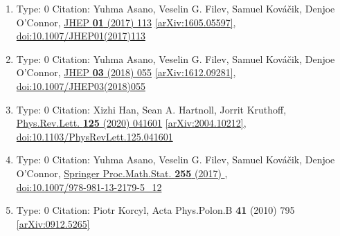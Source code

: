 \documentclass[a4paper,10pt]{article}
\begin{document}
\begin{enumerate}
\begin{enumerate}
  \item Type: 0 Citation: Yuhma Asano, Veselin G. Filev, Samuel Kováčik, Denjoe O'Connor, \href{https://www.doi.org/10.1007/JHEP01(2017)113}{JHEP {\bf 01} (2017) 113}  \href{https://arxiv.org/abs/1605.05597}{[arXiv:1605.05597]},\\\href{https://www.doi.org/10.1007/JHEP01(2017)113}{doi:10.1007/JHEP01(2017)113}
  \item Type: 0 Citation: Yuhma Asano, Veselin G. Filev, Samuel Kováčik, Denjoe O'Connor, \href{https://www.doi.org/10.1007/JHEP03(2018)055}{JHEP {\bf 03} (2018) 055}  \href{https://arxiv.org/abs/1612.09281}{[arXiv:1612.09281]},\\\href{https://www.doi.org/10.1007/JHEP03(2018)055}{doi:10.1007/JHEP03(2018)055}
  \item Type: 0 Citation: Xizhi Han, Sean A. Hartnoll, Jorrit Kruthoff, \href{https://www.doi.org/10.1103/PhysRevLett.125.041601}{Phys.Rev.Lett. {\bf 125} (2020) 041601}  \href{https://arxiv.org/abs/2004.10212}{[arXiv:2004.10212]},\\\href{https://www.doi.org/10.1103/PhysRevLett.125.041601}{doi:10.1103/PhysRevLett.125.041601}
  \item Type: 0 Citation: Yuhma Asano, Veselin G. Filev, Samuel Kováčik, Denjoe O'Connor, \href{https://www.doi.org/10.1007/978-981-13-2179-5_12}{Springer Proc.Math.Stat. {\bf 255} (2017) },\\\href{https://www.doi.org/10.1007/978-981-13-2179-5_12}{doi:10.1007/978-981-13-2179-5\_12}
  \item Type: 0 Citation: Piotr Korcyl, Acta Phys.Polon.B {\bf 41} (2010) 795  \href{https://arxiv.org/abs/0912.5265}{[arXiv:0912.5265]}

\end{enumerate}
\end{enumerate}
\end{document}
